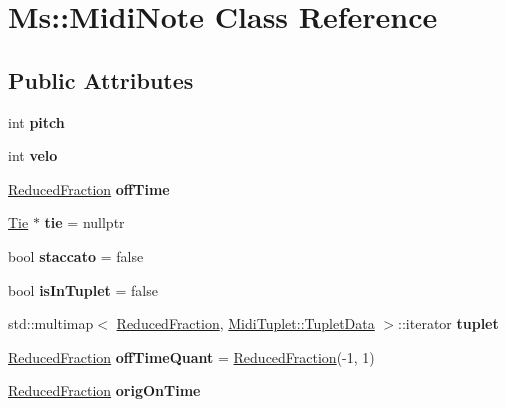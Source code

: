 \hypertarget{class_ms_1_1_midi_note}{}\section{Ms\+:\+:Midi\+Note Class Reference}
\label{class_ms_1_1_midi_note}
\subsection*{Public Attributes}
\begin{DoxyCompactItemize}
\item 
\mbox{\label{class_ms_1_1_midi_note_aed4868e703c1c26710bfb3e77ffde01e}} 
int {\bfseries pitch}
\item 
\mbox{\label{class_ms_1_1_midi_note_aaf2e5868651d972f5c7a72708538bafa}} 
int {\bfseries velo}
\item 
\mbox{\label{class_ms_1_1_midi_note_aad47685f6d0bc739c9c7d8dda1905d8d}} 
\hyperlink{class_ms_1_1_reduced_fraction}{Reduced\+Fraction} {\bfseries off\+Time}
\item 
\mbox{\label{class_ms_1_1_midi_note_a0a49397224a3020fdc067baeae9a67ff}} 
\hyperlink{class_ms_1_1_tie}{Tie} $\ast$ {\bfseries tie} = nullptr
\item 
\mbox{\label{class_ms_1_1_midi_note_a69049a0c8386108140a13015591786ca}} 
bool {\bfseries staccato} = false
\item 
\mbox{\label{class_ms_1_1_midi_note_a136a08656af810fa40248f2002f17a69}} 
bool {\bfseries is\+In\+Tuplet} = false
\item 
\mbox{\label{class_ms_1_1_midi_note_abdd8982c15a462c32e864b60a084b356}} 
std\+::multimap$<$ \hyperlink{class_ms_1_1_reduced_fraction}{Reduced\+Fraction}, \hyperlink{struct_ms_1_1_midi_tuplet_1_1_tuplet_data}{Midi\+Tuplet\+::\+Tuplet\+Data} $>$\+::iterator {\bfseries tuplet}
\item 
\mbox{\label{class_ms_1_1_midi_note_aa8c049318969caa4267c413c515b48dc}} 
\hyperlink{class_ms_1_1_reduced_fraction}{Reduced\+Fraction} {\bfseries off\+Time\+Quant} = \hyperlink{class_ms_1_1_reduced_fraction}{Reduced\+Fraction}(-\/1, 1)
\item 
\mbox{\label{class_ms_1_1_midi_note_ad70dba0e850dc8920e5d3edcb1d90da5}} 
\hyperlink{class_ms_1_1_reduced_fraction}{Reduced\+Fraction} {\bfseries orig\+On\+Time}
\end{DoxyCompactItemize}


